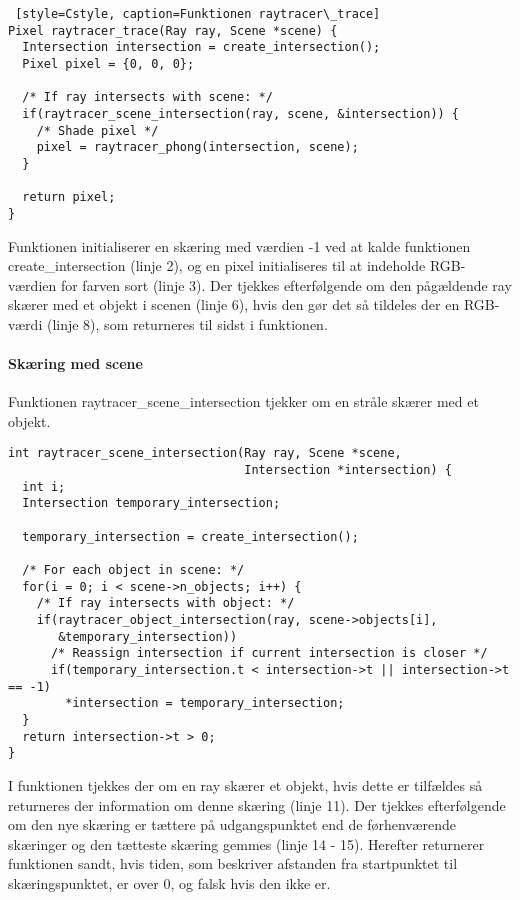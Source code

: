\begin{lstlisting} [style=Cstyle, caption=Funktionen raytracer\_trace]
Pixel raytracer_trace(Ray ray, Scene *scene) {
  Intersection intersection = create_intersection();
  Pixel pixel = {0, 0, 0};
  
  /* If ray intersects with scene: */
  if(raytracer_scene_intersection(ray, scene, &intersection)) {
    /* Shade pixel */
    pixel = raytracer_phong(intersection, scene);
  }
  
  return pixel;
}
\end{lstlisting}
Funktionen initialiserer en skæring med værdien -1 ved at kalde funktionen create\_intersection (linje 2), og en pixel initialiseres til at indeholde RGB-værdien for farven sort (linje 3). Der tjekkes efterfølgende om den pågældende ray skærer med et objekt i scenen (linje 6), hvis den gør det så tildeles der en RGB-værdi (linje 8), som returneres til sidst i funktionen. 

\paragraph{Skæring med scene}

Funktionen raytracer\_scene\_intersection tjekker om en stråle skærer med et objekt.

\begin{lstlisting}[style=Cstyle, caption=Funktionen raytracer\_scene\_intersection]
int raytracer_scene_intersection(Ray ray, Scene *scene, 
                                 Intersection *intersection) {
  int i;
  Intersection temporary_intersection;

  temporary_intersection = create_intersection();

  /* For each object in scene: */
  for(i = 0; i < scene->n_objects; i++) {
    /* If ray intersects with object: */
    if(raytracer_object_intersection(ray, scene->objects[i], 
       &temporary_intersection))
      /* Reassign intersection if current intersection is closer */
      if(temporary_intersection.t < intersection->t || intersection->t == -1)
        *intersection = temporary_intersection;
  }
  return intersection->t > 0;
}
\end{lstlisting}

I funktionen tjekkes der om en ray skærer et objekt, hvis dette er tilfældes så returneres der information om denne skæring (linje 11). Der tjekkes efterfølgende om den nye skæring er tættere på udgangspunktet end de førhenværende skæringer og den tætteste skæring gemmes (linje 14 - 15). Herefter returnerer funktionen sandt, hvis tiden, som beskriver afstanden fra startpunktet  til skæringspunktet, er over 0, og falsk hvis den ikke er.


